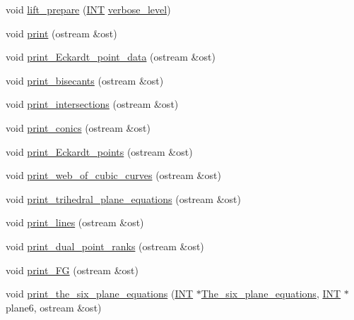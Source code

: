 \begin{DoxyCompactItemize}
\item 
void \mbox{\hyperlink{classarc__lifting_a5faae15fa91aadc062307cafedd52286}{lift\+\_\+prepare}} (\mbox{\hyperlink{galois_8h_a09fddde158a3a20bd2dcadb609de11dc}{I\+NT}} \mbox{\hyperlink{simeon_8_c_a818073fbcc2f439e7c56952f67386122}{verbose\+\_\+level}})
\item 
void \mbox{\hyperlink{classarc__lifting_ae1609cb80720bc005f0fc3ea65150185}{print}} (ostream \&ost)
\item 
void \mbox{\hyperlink{classarc__lifting_a0faa508f70aec4dced00ba6d779dc9ea}{print\+\_\+\+Eckardt\+\_\+point\+\_\+data}} (ostream \&ost)
\item 
void \mbox{\hyperlink{classarc__lifting_aef93f2c48dbbdbc91a45c166394b2e45}{print\+\_\+bisecants}} (ostream \&ost)
\item 
void \mbox{\hyperlink{classarc__lifting_a56673f5d1a85379718d680a8577890ef}{print\+\_\+intersections}} (ostream \&ost)
\item 
void \mbox{\hyperlink{classarc__lifting_a78b48841fa29136a0ced29530d11165a}{print\+\_\+conics}} (ostream \&ost)
\item 
void \mbox{\hyperlink{classarc__lifting_a2ae75a963209778680e23e7775217581}{print\+\_\+\+Eckardt\+\_\+points}} (ostream \&ost)
\item 
void \mbox{\hyperlink{classarc__lifting_a7d973639906dbd9c40ffc8cc23e897dc}{print\+\_\+web\+\_\+of\+\_\+cubic\+\_\+curves}} (ostream \&ost)
\item 
void \mbox{\hyperlink{classarc__lifting_a0891242257251ca92491d6b9192645c6}{print\+\_\+trihedral\+\_\+plane\+\_\+equations}} (ostream \&ost)
\item 
void \mbox{\hyperlink{classarc__lifting_a009bcb8a7affe10703e00d89989d69ab}{print\+\_\+lines}} (ostream \&ost)
\item 
void \mbox{\hyperlink{classarc__lifting_a0b36290ecb44ebdf12c4e6a4027ea8f0}{print\+\_\+dual\+\_\+point\+\_\+ranks}} (ostream \&ost)
\item 
void \mbox{\hyperlink{classarc__lifting_a1de75d5e301d903c419f99873be9b696}{print\+\_\+\+FG}} (ostream \&ost)
\item 
void \mbox{\hyperlink{classarc__lifting_a4cf3fce778a27feb4072ec56d8fc32d0}{print\+\_\+the\+\_\+six\+\_\+plane\+\_\+equations}} (\mbox{\hyperlink{galois_8h_a09fddde158a3a20bd2dcadb609de11dc}{I\+NT}} $\ast$\mbox{\hyperlink{classarc__lifting_a143fc977580a749b691b29cf1ed97b45}{The\+\_\+six\+\_\+plane\+\_\+equations}}, \mbox{\hyperlink{galois_8h_a09fddde158a3a20bd2dcadb609de11dc}{I\+NT}} $\ast$plane6, ostream \&ost)

\end{DoxyCompactItemize}

